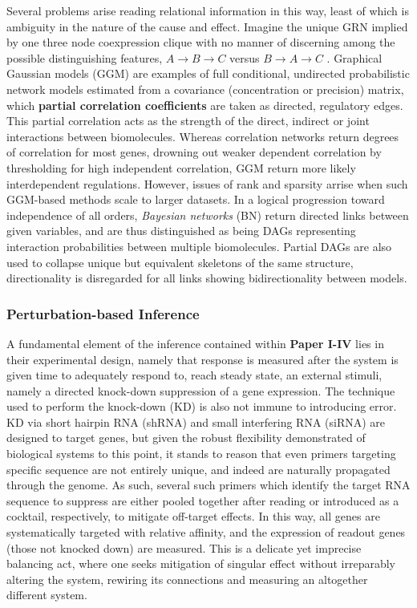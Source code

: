 Several problems arise reading relational information in this way, least of which is ambiguity in the nature of the cause and effect. Imagine the unique GRN implied by one three node coexpression clique with no manner of discerning among the possible distinguishing features, \eg $A\to B\to C$ versus $ B\to A\to C$ \citep{markowetz2007inferring}.
Graphical Gaussian models (GGM) are examples of full conditional, undirected probabilistic network models estimated from a covariance (\ie concentration or precision) matrix, which \textbf{partial correlation coefficients} are taken as directed, regulatory edges. This partial correlation acts as the strength of the direct, indirect or joint interactions between biomolecules. Whereas correlation networks return degrees of correlation for most genes, drowning out weaker dependent correlation by thresholding for high independent correlation, GGM return more likely interdependent regulations\citep{schafer2004empirical}. However, issues of rank and sparsity arrise when such GGM-based methods scale to larger datasets. In a logical progression toward independence of all orders, \emph{Bayesian networks} (BN) return directed links between given variables, and are thus distinguished as being DAGs representing interaction probabilities between multiple biomolecules. Partial DAGs are also used to collapse unique but equivalent skeletons of the same structure, \ie directionality is disregarded for all links showing bidirectionality between models.


\subsubsection{Perturbation-based Inference}
\label{sec:ODE}
A fundamental element of the inference contained within \textbf{Paper I-IV} lies in their experimental design, namely that response is measured after the system is given time to adequately respond to, \ie reach steady state, an external stimuli, namely a directed knock-down suppression of a gene expression. The technique used to perform the knock-down (KD) is also not immune to introducing error. KD via short hairpin RNA (shRNA) and small interfering RNA (siRNA) are designed to target genes, but given the robust flexibility demonstrated of biological systems to this point, it stands to reason that even primers targeting specific sequence are not entirely unique, and indeed are naturally propagated through the genome. As such, several such primers which identify the target RNA sequence to suppress are either pooled together after reading or introduced as a cocktail, respectively, to mitigate off-target effects. In this way, all genes are systematically targeted with relative affinity, and the expression of readout genes (those not knocked down) are measured. This is a delicate yet imprecise balancing act, where one seeks mitigation of singular effect without irreparably altering the system, rewiring its connections and measuring an altogether different system. 

